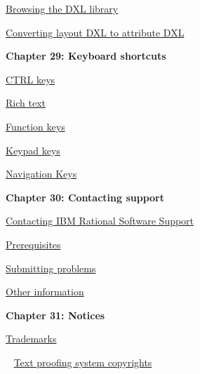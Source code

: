 \documentclass[11pt,a4paper]{article}
\begin{document}
\href{https://www.ibm.com/support/knowledgecenter/search/Browsing%20the%20DXL%20library?scope=SSYQBZ_9.6.1}{Browsing the DXL library}

\href{https://www.ibm.com/support/knowledgecenter/search/Converting%20layout%20DXL%20to%20attribute%20DXL?scope=SSYQBZ_9.6.1}{Converting layout DXL to attribute DXL} \\



\begin{Large}\textbf{Chapter 29: Keyboard shortcuts} \end{Large} 
\vspace{1mm}

\href{https://www.ibm.com/support/knowledgecenter/search/CTRL%20keys?scope=SSYQBZ_9.6.1}{CTRL keys}

\href{https://www.ibm.com/support/knowledgecenter/search/Rich%20text?scope=SSYQBZ_9.6.1}{Rich text}

\href{https://www.ibm.com/support/knowledgecenter/search/Function%20keys?scope=SSYQBZ_9.6.1}{Function keys}

\href{https://www.ibm.com/support/knowledgecenter/search/Keypad%20keys?scope=SSYQBZ_9.6.1}{Keypad keys}

\href{https://www.ibm.com/support/knowledgecenter/search/Navigation%20Keys?scope=SSYQBZ_9.6.1}{Navigation Keys} \\


\begin{Large}\textbf{Chapter 30: Contacting support} \end{Large} 
\vspace{1mm}

\href{https://www.ibm.com/support/knowledgecenter/search/Contacting%20IBM%20Rational%20Software%20Support?scope=SSYQBZ_9.6.1}{Contacting IBM Rational Software Support}

\href{https://www.ibm.com/support/knowledgecenter/search/Prerequisites?scope=SSYQBZ_9.6.1}{Prerequisites}

\href{https://www.ibm.com/support/knowledgecenter/search/Submitting%20problems?scope=SSYQBZ_9.6.1}{Submitting problems}

\href{https://www.ibm.com/support/knowledgecenter/search/Other%20information?scope=SSYQBZ_9.6.1}{Other information} \\


\begin{Large}\textbf{Chapter 31: Notices} \end{Large} 
\vspace{1mm}

\href{https://www.ibm.com/support/knowledgecenter/search/Trademarks?scope=SSYQBZ_9.6.1}{Trademarks}

\,\,\, \href{https://www.ibm.com/support/knowledgecenter/search/Text%20proofing%20system%20copyrights?scope=SSYQBZ_9.6.1}{Text proofing system copyrights} \\
\end{document}
